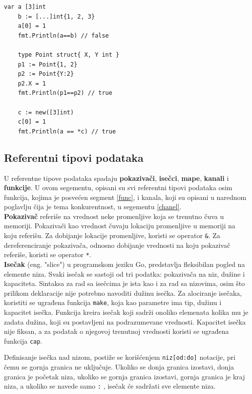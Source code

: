 \documentclass[12pt,oneside]{memoir}
\begin{document}
\newpage

\begin{center}
\begin{lstlisting}[caption=Primer koji demonstrira rad sa nizovima i strukturama, label={lst:arr_str},  backgroundcolor=\color{background}]
	var a [3]int
	b := [...]int{1, 2, 3}
	a[0] = 1
	fmt.Println(a==b) // false

	type Point struct{ X, Y int }
	p1 := Point{1, 2}
	p2 := Point{Y:2}
	p2.X = 1
	fmt.Println(p1==p2) // true

	c := new([3]int)
	c[0] = 1
	fmt.Println(a == *c) // true			
\end{lstlisting}
\end{center}

\subsection{Referentni tipovi podataka}
U referentne tipove podataka spadaju \textbf{pokazivači}, \textbf{isečci}, \textbf{mape}, \textbf{kanali} i \textbf{funkcije}. U ovom segementu, opisani su svi referentni tipovi podataka osim funkcija, kojima je posvećen segment \ref{func}, i kanala, koji su opisani u narednom poglavlju čija je tema konkurentnost, u segementu \ref{chanel}. 
\\

\textbf{Pokazivač} referiše na vrednost neke promenljive koja se trenutno čuva u memoriji. Pokazivači kao vrednost čuvaju lokaciju promenljive u memoriji na koju referišu. Za dobijanje lokacije promenljive, koristi se operator \texttt{\&}. Za dereferenciranje pokazivača, odnosno dobijanje vrednosti na koju pokazivač referiše, koristi se operator \texttt{*}.
\\

\textbf{Isečak} (eng. "slice") u programskom jeziku Go, predstavlja fleksibilan pogled na elemente niza. Svaki isečak se sastoji od tri podatka: pokazivača na niz, dužine i kapaciteta. Sintaksa za rad sa isečcima je ista kao i za rad sa nizovima, osim što prilikom deklaracije nije potrebno navoditi dužinu isečka. Za alociranje isečaka, koristiti se ugrađena funkcija \texttt{make}, koja kao parametre ima tip, dužinu i kapacitet isečka. Funkcija kreira isečak koji sadrži onoliko elemenata kolika mu je zadata dužina, koji su postavljeni na podrazumevane vrednosti. Kapacitet isečka nije fiksan, a za podatak o njegovoj trenutnoj vrednosti koristi se ugrađena funkcija \texttt{cap}.

Definisanje isečka nad nizom, postiže se korišćenjem \texttt{niz[od:do]} notacije, pri čemu se gornja granica ne uključuje. Ukoliko se donja granica izostavi, donja granica je početak niza, ukoliko se gornja granica izostavi, gornja granica je kraj niza, a ukoliko se navede samo \texttt{:} , isečak će sadržati sve elemente niza. 
\end{document}
